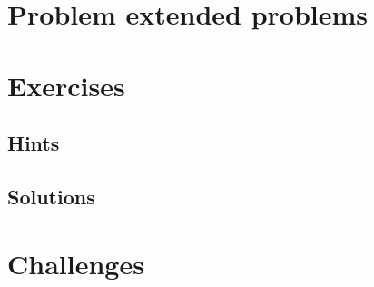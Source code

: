 \section{Problem extended problems}





















\section{Exercises}


\ifdefined\IncludeExerciseHints
\subsection*{Hints}

\fi

\ifdefined\IncludeExerciseSolutions
\subsection*{Solutions}

\fi

\section{Challenges}






